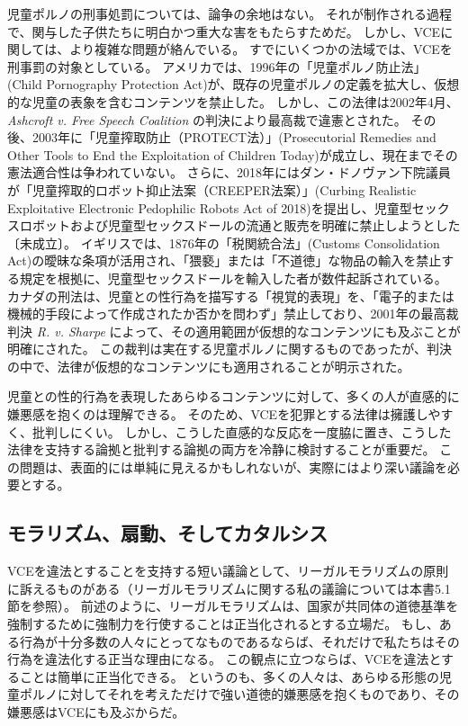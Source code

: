 \documentclass[paper=a4,book,openany]{jlreq} \usepackage{mystyle}
\begin{document}
児童ポルノの刑事処罰については、論争の余地はない。
それが制作される過程で、関与した子供たちに明白かつ重大な害をもたらすためだ。
しかし、VCEに関しては、より複雑な問題が絡んでいる。
すでにいくつかの法域では、VCEを刑事罰の対象としている。
アメリカでは、1996年の「児童ポルノ防止法」(Child Pornography Protection Act)が、既存の児童ポルノの定義を拡大し、仮想的な児童の表象を含むコンテンツを禁止した。
しかし、この法律は2002年4月、\emph{Ashcroft v. Free Speech Coalition} の判決により最高裁で違憲とされた。
その後、2003年に「児童搾取防止（PROTECT法）」(Prosecutorial Remedies and Other Tools to End the Exploitation of Children Today)が成立し、現在までその憲法適合性は争われていない。
さらに、2018年にはダン・ドノヴァン下院議員が「児童搾取的ロボット抑止法案（CREEPER法案）」(Curbing Realistic Exploitative Electronic Pedophilic Robots Act of 2018)を提出し、児童型セックスロボットおよび児童型セックスドールの流通と販売を明確に禁止しようとした〔未成立〕。
イギリスでは、1876年の「税関統合法」(Customs Consolidation Act)の曖昧な条項が活用され、「猥褻」または「不道徳」な物品の輸入を禁止する規定を根拠に、児童型セックスドールを輸入した者が数件起訴されている。
カナダの刑法は、児童との性行為を描写する「視覚的表現」を、「電子的または機械的手段によって作成されたか否かを問わず」禁止しており、2001年の最高裁判決 \emph{R. v. Sharpe} によって、その適用範囲が仮想的なコンテンツにも及ぶことが明確にされた。
この裁判は実在する児童ポルノに関するものであったが、判決の中で、法律が仮想的なコンテンツにも適用されることが明示された。

児童との性的行為を表現したあらゆるコンテンツに対して、多くの人が直感的に嫌悪感を抱くのは理解できる。
そのため、VCEを犯罪とする法律は擁護しやすく、批判しにくい。
しかし、こうした直感的な反応を一度脇に置き、こうした法律を支持する論拠と批判する論拠の両方を冷静に検討することが重要だ。
この問題は、表面的には単純に見えるかもしれないが、実際にはより深い議論を必要とする。

\subsection{モラリズム、扇動、そしてカタルシス}

VCEを違法とすることを支持する短い議論として、リーガルモラリズムの原則に訴えるものがある（リーガルモラリズムに関する私の議論については本書5.1節を参照）。
前述のように、リーガルモラリズムは、国家が共同体の道徳基準を強制するために強制力を行使することは正当化されるとする立場だ。
もし、ある行為が十分多数の人々にとってなものであるならば、それだけで私たちはその行為を違法化する正当な理由になる。
この観点に立つならば、VCEを違法とすることは簡単に正当化できる。
というのも、多くの人々は、あらゆる形態の児童ポルノに対してそれを考えただけで強い道徳的嫌悪感を抱くものであり、その嫌悪感はVCEにも及ぶからだ。
\end{document}
